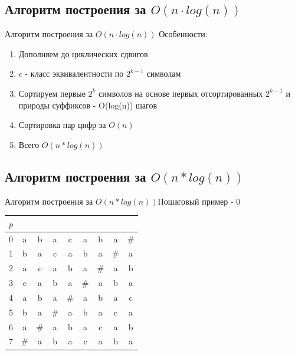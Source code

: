 \documentclass[10pt]{beamer}
\begin{document}
\subsection{Алгоритм построения за $O(n \cdot log(n))$}
\begin{frame}[fragile]{Алгоритм построения за $O(n \cdot log(n))$}
Особенности:
\begin{enumerate}
\item Дополняем до циклических сдвигов
\item $c$ - класс эквивалентности по $2^{k-1}$ символам
\item Сортируем первые $2^k$ символов на основе первых отсортированных $2^{k-1}$ и природы суффиксов - O(log(n)) шагов
\item Сортировка пар цифр за $O(n)$
\item Всего $O(n*log(n))$
\end{enumerate}
\end{frame}
\subsection{Алгоритм построения за $O(n*log(n))$}

\begin{frame}[fragile]{Алгоритм построения за $O(n*log(n))$}{Пошаговый пример - 0}
\begin{center}
\begin{tabular}{ c|cccccccc } 
 $p$ & & & & & & & & \\ 
 \hline
 0 & a & b & a & c & a & b & a & \# \\ 
 \hline
 1 & b & a & c & a & b & a & \# & a \\ 
 \hline
 2 & a & c & a & b & a & \# & a & b \\ 
 \hline
 3 & c & a & b & a & \# & a & b & a \\ 
 \hline
 4 & a & b & a & \# & a & b & a & c \\ 
 \hline
 5 & b & a & \# & a & b & a & c & a \\ 
 \hline
 6 & a & \# & a & b & a & c & a & b \\ 
  \hline
 7 & \# & a & b & a & c & a & b & a \\ 
\end{tabular}
\end{center}
\end{frame}
\end{document}
